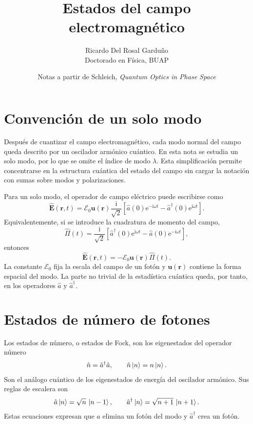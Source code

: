 \documentclass[11pt]{article}
\title{Estados del campo electromagn\'etico}
\author{Ricardo Del Rosal Gardu\~no \\ \small Doctorado en F\'isica, BUAP}
\date{Notas a partir de Schleich, \emph{Quantum Optics in Phase Space}}
\newcommand{\ii}{\mathrm{i}}
\newcommand{\ee}{\mathrm{e}}
\newcommand{\vb}[1]{\mathbf{#1}}
\newcommand{\adag}{\hat a^\dagger}
\newcommand{\Ezero}{\mathcal E_0}
\begin{document}
\maketitle

\section{Convenci\'on de un solo modo}

Despu\'es de cuantizar el campo electromagn\'etico, cada modo normal del campo
queda descrito por un oscilador arm\'onico cu\'antico. En esta nota se estudia
un solo modo, por lo que se omite el \'indice de modo $\lambda$. Esta
simplificaci\'on permite concentrarse en la estructura cu\'antica del estado
del campo sin cargar la notaci\'on con sumas sobre modos y polarizaciones.

Para un solo modo, el operador de campo el\'ectrico puede escribirse como
\begin{equation}
  \hat{\vb E}(\vb r,t)
  =
  \Ezero \vb u(\vb r)
  \frac{\ii}{\sqrt2}
  \left[
    \hat a(0)\ee^{-\ii\omega t}
    -
    \adag(0)\ee^{\ii\omega t}
  \right].
\end{equation}
Equivalentemente, si se introduce la cuadratura de momento del campo,
\begin{equation}
  \hat\Pi(t)
  =
  \frac{\ii}{\sqrt2}
  \left[
    \adag(0)\ee^{\ii\omega t}
    -
    \hat a(0)\ee^{-\ii\omega t}
  \right],
\end{equation}
entonces
\begin{equation}
  \hat{\vb E}(\vb r,t)
  =
  -\Ezero \vb u(\vb r)\hat\Pi(t).
\end{equation}
La constante $\Ezero$ fija la escala del campo de un fot\'on y
$\vb u(\vb r)$ contiene la forma espacial del modo. La parte no trivial de la
estad\'istica cu\'antica queda, por tanto, en los operadores
$\hat a$ y $\adag$.

\section{Estados de n\'umero de fotones}

Los estados de n\'umero, o estados de Fock, son los eigenestados del operador
n\'umero
\begin{equation}
  \hat n=\adag \hat a,
  \qquad
  \hat n\ket{n}=n\ket{n}.
\end{equation}
Son el an\'alogo cu\'antico de los eigenestados de energ\'ia del oscilador
arm\'onico. Sus reglas de escalera son
\begin{equation}
  \hat a\ket{n}=\sqrt n\,\ket{n-1},
  \qquad
  \adag\ket{n}=\sqrt{n+1}\,\ket{n+1}.
\end{equation}
Estas ecuaciones expresan que $\hat a$ elimina un fot\'on del modo y
$\adag$ crea un fot\'on.
\end{document}
